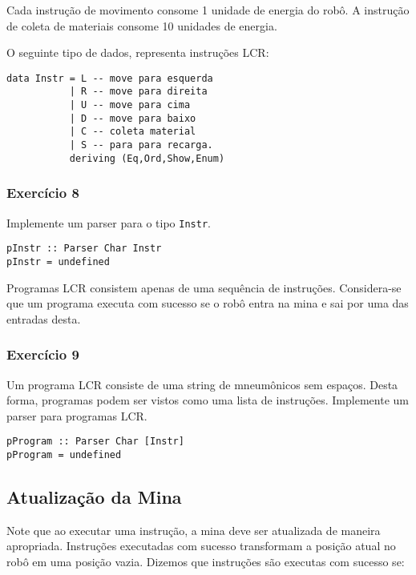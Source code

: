 \documentclass[a4paper]{article}
\begin{document}
Cada instrução de movimento consome 1 unidade de energia do robô. A instrução de
coleta de materiais consome 10 unidades de energia.

O seguinte tipo de dados, representa instruções LCR:

\begin{verbatim}
data Instr = L -- move para esquerda
           | R -- move para direita
           | U -- move para cima
           | D -- move para baixo
           | C -- coleta material
           | S -- para para recarga.
           deriving (Eq,Ord,Show,Enum)
\end{verbatim}

\subsubsection{Exercício 8}
\label{sec:org308cc30}

Implemente um parser para o tipo \texttt{Instr}.

\begin{verbatim}
pInstr :: Parser Char Instr
pInstr = undefined
\end{verbatim}

Programas LCR consistem apenas de uma sequência de instruções. Considera-se que um
programa executa com sucesso se o robô entra na mina e sai por uma das entradas
desta.

\subsubsection{Exercício 9}
\label{sec:org6818cf1}

Um programa LCR consiste de uma string de mneumônicos sem
espaços. Desta forma, programas podem ser vistos como uma lista de instruções.
Implemente um parser para programas LCR.

\begin{verbatim}
pProgram :: Parser Char [Instr]
pProgram = undefined
\end{verbatim}

\subsection{Atualização da Mina}
\label{sec:orgc34f437}

Note que ao executar uma instrução, a mina deve ser atualizada de maneira apropriada.
Instruções executadas com sucesso transformam a posição atual no robô em uma posição vazia.
Dizemos que instruções são executas com sucesso se:
\end{document}
